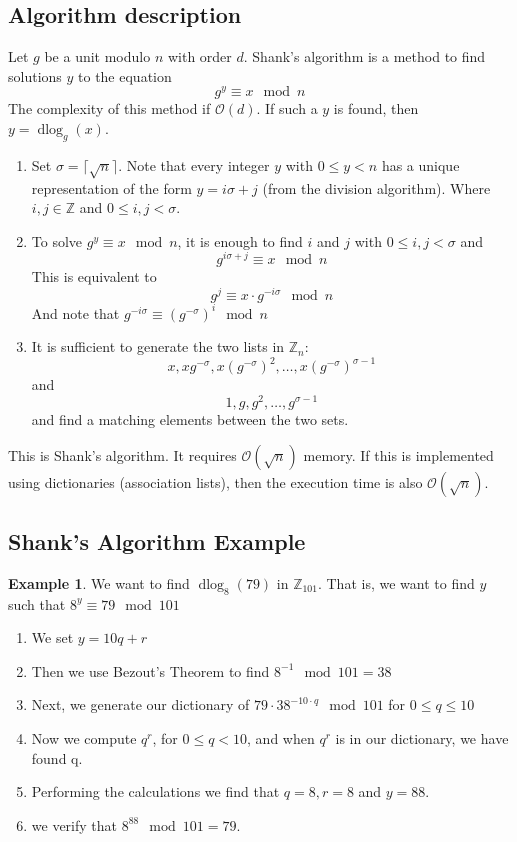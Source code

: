 \documentclass[10pt]{article}
\newcommand{\Z}{\mathbb{Z}}
\theoremstyle{definition}
\newtheorem{ex}[theorem]{Example}
\theoremstyle{remark}
\def\Z{\mathbb{ Z}}
\DeclareMathOperator{\dlog}{dlog}
\newcommand{\bigoh}{\mathcal{O}}
\begin{document}
\subsection{Algorithm description}
Let $g$ be a unit modulo $n$ with order $d$.  Shank's algorithm is a method to find solutions $y$ to the equation $$g^y \equiv x \mod n$$ The complexity of this method if $\bigoh(d)$.  If such a $y$ is found, then $y = \dlog_g(x)$.
\begin{enumerate}
\item Set $\sigma = \lceil \sqrt{n} \rceil$.  Note that every integer $y$ with $0 \leq y < n$ has a unique representation of the form $y = i\sigma + j$ (from the division algorithm).  Where $i,j \in \Z$ and $0\leq i,j < \sigma$.
\item To solve $g^y \equiv x \mod n$, it is enough to find $i$ and $j$ with $0\leq i,j < \sigma$ and $$g^{i\sigma + j} \equiv x \mod n$$
This is equivalent to $$g^j \equiv x \cdot g^{-i\sigma} \mod n$$
And note that $g^{-i\sigma} \equiv (g^{-\sigma})^i \mod n$
\item It is sufficient to generate the two lists in $\Z_n$:
$$x, xg^{-\sigma}, x(g^{-\sigma})^2, \ldots, x(g^{-\sigma})^{\sigma -1}$$
and
$$1,g,g^2,\ldots,g^{\sigma - 1}$$
and find a matching elements between the two sets.
\end{enumerate}
This is Shank's algorithm.  It requires $\bigoh(\sqrt{n})$ memory.  If this is implemented using dictionaries (association lists), then the execution time is also $\bigoh(\sqrt{n})$.
\subsection{Shank's Algorithm Example}
\begin{ex}
We want to find $\dlog_8(79)$ in $\Z_101$.  That is, we want to find $y$ such that $8^y \equiv 79 \mod 101$
\begin{enumerate}
\item We set $y = 10q + r$
\item Then we use Bezout's Theorem to find $8^{-1} \mod 101 = 38$
\item Next, we generate our dictionary of $79 \cdot 38^{-10  \cdot q} \mod 101$ for $0 \leq q \leq 10$
\item Now we compute $q^r$, for $0 \leq q < 10$, and when $q^r$ is in our dictionary, we have found q.
\item Performing the calculations we find that $q = 8, r = 8$ and $y = 88$.
\item we verify that $8^{88} \mod 101 = 79$.
\end{enumerate}
\end{ex}
\end{document}

